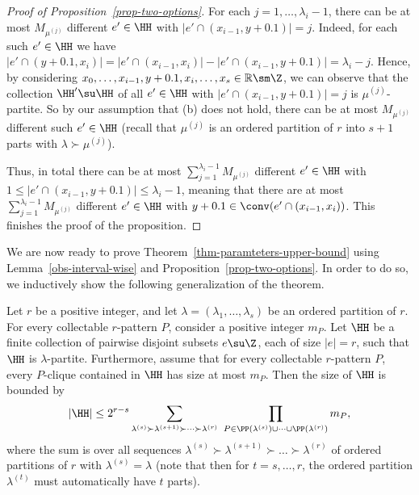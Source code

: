 \begin{proof}[Proof of Proposition~\ref{prop-two-options}]
For each $j=1,\dots,\lambda_i-1$, there can be at most $M_{\mu^{(j)}}$ different $e'\in\HH$ with $|e'\cap (x_{i-1},y+0.1)|=j$. Indeed, for each such $e'\in\HH$ we have $|e'\cap (y+0.1,x_i)|=|e'\cap (x_{i-1},x_i)|-|e'\cap (x_{i-1},y+0.1)|=\lambda_i-j$. Hence, by considering $x_0,\dots,x_{i-1}, y+0.1,x_i,\dots,x_s\in \mathbb{R}\sm \Z$, we can observe that the collection $\HH'\su \HH$ of all $e'\in\HH$ with $|e'\cap (x_{i-1},y+0.1)|=j$ is $\mu^{(j)}$-partite. So by our assumption that (b) does not hold, there can be at most $M_{\mu^{(j)}}$ different such $e'\in\HH$ (recall that $\mu^{(j)}$ is an ordered partition of $r$ into $s+1$ parts with $\lambda\succ \mu^{(j)}$).

Thus, in total there can be at most $\sum_{j=1}^{\lambda_i-1} M_{\mu^{(j)}}$ different $e'\in\HH$ with $1\le |e'\cap (x_{i-1},y+0.1)|\le \lambda_i-1$, meaning that there are at most $\sum_{j=1}^{\lambda_i-1} M_{\mu^{(j)}}$ different $e'\in\HH$ with $y+0.1\in \conv(e'\cap (x_{i-1},x_i))$. This finishes the proof of the proposition.
\end{proof}

We are now ready to prove Theorem~\ref{thm-paramteters-upper-bound} using Lemma~\ref{obs-interval-wise} and Proposition~\ref{prop-two-options}. In order to do so, we inductively show the following generalization of the theorem.

\begin{theorem} \label{thm-induction-upper-bound}
Let $r$ be a positive integer, and let $\lambda=(\lambda_1,\dots,\lambda_s)$ be an ordered partition of $r$. For every collectable $r$-pattern $P$, consider a positive integer $m_P$. Let $\HH$ be a finite collection of pairwise disjoint subsets $e\su \Z$, each of size $|e|=r$, such that $\HH$ is $\lambda$-partite. Furthermore, assume that for every collectable $r$-pattern $P$, every $P$-clique contained in $\HH$ has size at most $m_P$. Then the size of $\HH$ is bounded by
\begin{equation}
    |\HH|\le 2^{r-s} \sum_{\lambda^{(s)} \succ \lambda^{(s+1)} \succ \dots \succ \lambda^{(r)}}\ \prod_{ P\in \PP(\lambda^{(s)})\cup\dots\cup \PP(\lambda^{(r)}) } m_{P},
\end{equation}
where the sum is over all sequences $\lambda^{(s)} \succ \lambda^{(s+1)} \succ \dots \succ \lambda^{(r)}$ of ordered partitions of $r$ with $\lambda^{(s)}=\lambda$ (note that then for $t=s,\dots,r$, the ordered partition $\lambda^{(t)}$ must automatically have $t$ parts).
\end{theorem}

